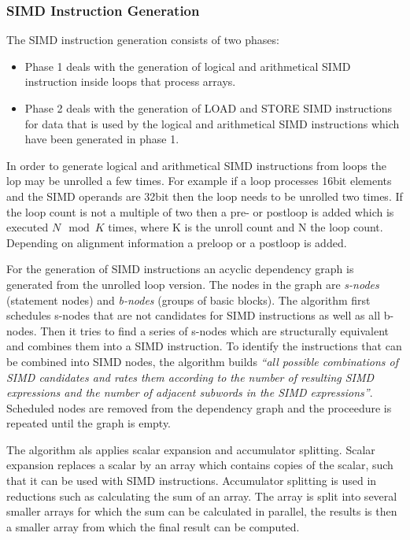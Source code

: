 \documentclass[a4paper,10pt]{article}
\begin{document}
\subsubsection{SIMD Instruction Generation}
The SIMD instruction generation consists of two phases:
\begin{itemize}
 \item Phase 1 deals with the generation of logical and arithmetical SIMD instruction inside loops that process arrays.
 \item Phase 2 deals with the generation of LOAD and STORE SIMD instructions for data that is used by the logical and arithmetical SIMD 
       instructions which have been generated in phase 1.
\end{itemize}

In order to generate logical and arithmetical SIMD instructions from loops the lop may be unrolled a few times. For example if a loop 
processes 16bit elements and the SIMD operands are 32bit then the loop needs to be unrolled two times. If the loop count is not a multiple 
of two then a pre- or postloop is added which is executed $N \mod K$ times, where K is the unroll count and N the loop count. Depending on 
alignment information a preloop or a postloop is added.

For the generation of SIMD instructions an acyclic dependency graph is generated from the unrolled loop version. The nodes in the graph 
are \textit{s-nodes} (statement nodes) and \textit{b-nodes} (groups of basic blocks). The algorithm first schedules s-nodes that are not 
candidates for SIMD instructions as well as all b-nodes. Then it tries to find a series of s-nodes which are structurally equivalent and 
combines them into a SIMD instruction. To identify the instructions that can be combined into SIMD nodes, the algorithm builds 
\textit{``all possible combinations of SIMD candidates and rates them according to the number of resulting SIMD expressions and the number 
of adjacent subwords in the SIMD expressions''}. Scheduled nodes are removed from the dependency graph and the proceedure is repeated 
until the graph is empty.

The algorithm als applies scalar expansion and accumulator splitting. Scalar expansion replaces a scalar by an array which 
contains copies of the scalar, such that it can be used with SIMD instructions. Accumulator splitting is used in reductions such as 
calculating the sum of an array. The array is split into several smaller arrays for which the sum can be calculated in parallel, the 
results is then a smaller array from which the final result can be computed.
\end{document}
